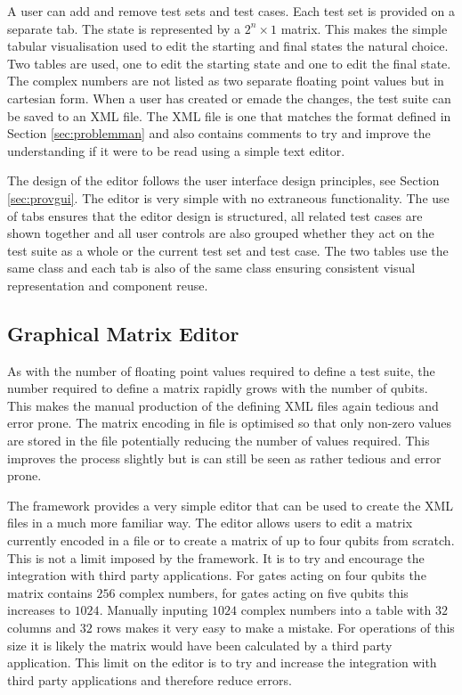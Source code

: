 A user can add and remove test sets and test cases.
Each test set is provided on a separate tab.
The state is represented by a $2^n\times{1}$ matrix.
This makes the simple tabular visualisation used to edit the starting and final states the natural choice.
Two tables are used, one to edit the starting state and one to edit the final state.
The complex numbers are not listed as two separate floating point values but in cartesian form.
When a user has created or emade the changes, the test suite can be saved to an XML file.
The XML file is one that matches the format defined in Section \ref{sec:problemman} and also contains comments to try and improve the understanding if it were to be read using a simple text editor.

The design of the editor follows the user interface design principles, see Section \ref{sec:provgui}.
The editor is very simple with no extraneous functionality.
The use of tabs ensures that the editor design is structured, all related test cases are shown together and all user controls are also grouped whether they act on the test suite as a whole or the current test set and test case.
The two tables use the same class and each tab is also of the same class ensuring consistent visual representation and component reuse.

\subsection{Graphical Matrix Editor}
\label{sec:indmatrixeditor}
As with the number of floating point values required to define a test suite, the number required to define a matrix rapidly grows with the number of qubits.
This makes the manual production of the defining XML files again tedious and error prone.
The matrix encoding in file is optimised so that only non-zero values are stored in the file potentially reducing the number of values required.
This improves the process slightly but is can still be seen as rather tedious and error prone.

The framework provides a very simple editor that can be used to create the XML files in a much more familiar way.
The editor allows users to edit a matrix currently encoded in a file or to create a matrix of up to four qubits from scratch.
This is not a limit imposed by the framework.
It is to try and encourage the integration with third party applications.
For gates acting on four qubits the matrix contains $256$ complex numbers, for gates acting on five qubits this increases to $1024$.
Manually inputing $1024$ complex numbers into a table with $32$ columns and $32$ rows makes it very easy to make a mistake.
For operations of this size it is likely the matrix would have been calculated by a third party application.
This limit on the editor is to try and increase the integration with third party applications and therefore reduce errors.



